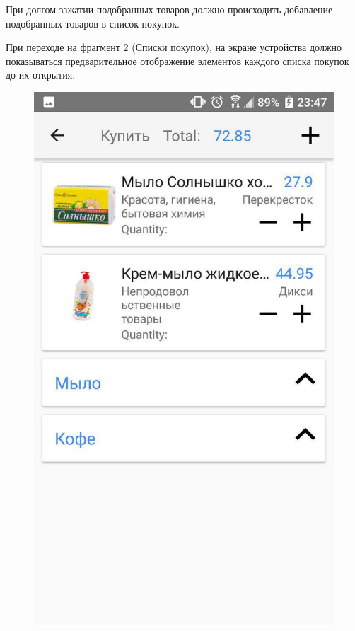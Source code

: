 При долгом зажатии подобранных товаров должно происходить добавление
подобранных товаров в список покупок.

При переходе на фрагмент 2 (Списки покупок), на экране устройства должно
показываться предварительное отображение элементов каждого списка покупок до их
открытия.

\begin{figure}[h!]
    \centering
    \includegraphics[height=0.38\textheight]{./screenshots/3/shoplist.jpg}

\end{figure}
